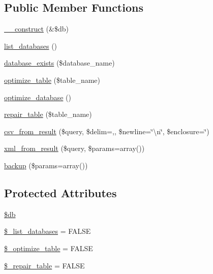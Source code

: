 \subsection*{Public Member Functions}
\begin{DoxyCompactItemize}
\item 
\mbox{\hyperlink{class_c_i___d_b__utility_aaf2ef772755ec6f361d44e16cc9ffd69}{\+\_\+\+\_\+construct}} (\&\$db)
\item 
\mbox{\hyperlink{class_c_i___d_b__utility_a8486b247a8868504b055622cb2dd34d3}{list\+\_\+databases}} ()
\item 
\mbox{\hyperlink{class_c_i___d_b__utility_ac0ba63aa14b19a37d4773fcc252bde81}{database\+\_\+exists}} (\$database\+\_\+name)
\item 
\mbox{\hyperlink{class_c_i___d_b__utility_a6aed9274f43b64eeee607d172b51529d}{optimize\+\_\+table}} (\$table\+\_\+name)
\item 
\mbox{\hyperlink{class_c_i___d_b__utility_acb26598e177f525b39978f6dfca1f212}{optimize\+\_\+database}} ()
\item 
\mbox{\hyperlink{class_c_i___d_b__utility_a41a627004d26198c69bf466eef7eaeeb}{repair\+\_\+table}} (\$table\+\_\+name)
\item 
\mbox{\hyperlink{class_c_i___d_b__utility_aba64f8ac8169c018d251eefe95de1c84}{csv\+\_\+from\+\_\+result}} (\$query, \$delim=\textquotesingle{},\textquotesingle{}, \$newline=\char`\"{}\textbackslash{}n\char`\"{}, \$enclosure=\textquotesingle{}\char`\"{}\textquotesingle{}) 
\item 
\mbox{\hyperlink{class_c_i___d_b__utility_a09decb7db409060365ad2c20072523f9}{xml\+\_\+from\+\_\+result}} (\$query, \$params=array())
\item 
\mbox{\hyperlink{class_c_i___d_b__utility_abe2b9d47f950dfbaf8c6ec757a9af9a2}{backup}} (\$params=array())
\end{DoxyCompactItemize}
\subsection*{Protected Attributes}
\begin{DoxyCompactItemize}
\item 
\mbox{\hyperlink{class_c_i___d_b__utility_a1fa3127fc82f96b1436d871ef02be319}{\$db}}
\item 
\mbox{\hyperlink{class_c_i___d_b__utility_afe3a5b80562d93d6bc7e2b53c95b7e5a}{\$\+\_\+list\+\_\+databases}} = F\+A\+L\+SE
\item 
\mbox{\hyperlink{class_c_i___d_b__utility_a083199e5c22c78912dae0a47bb2d7fad}{\$\+\_\+optimize\+\_\+table}} = F\+A\+L\+SE
\item 
\mbox{\hyperlink{class_c_i___d_b__utility_a5cf925cbd52e3f6ba5b7ada3fa436efc}{\$\+\_\+repair\+\_\+table}} = F\+A\+L\+SE
\end{DoxyCompactItemize}


